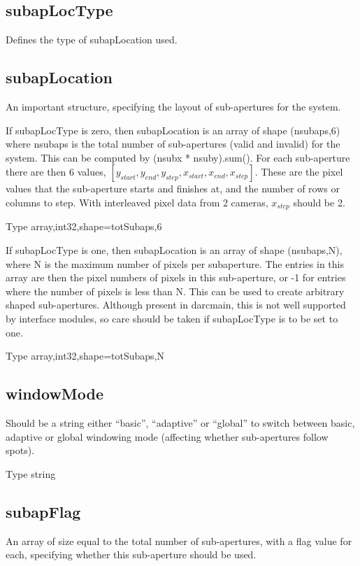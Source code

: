 \documentclass[a4,10pt]{article}
\begin{document}
\subsection{subapLocType}
Defines the type of subapLocation used.


\subsection{subapLocation}

An important structure, specifying the layout of sub-apertures for the
system.  

If subapLocType is zero, then subapLocation is an array of shape (nsubaps,6) where nsubaps is the
total number of sub-apertures (valid and invalid) for the system.
This can be computed by (nsubx * nsuby).sum().  For each sub-aperture
there are then 6 values,
$[y_{start},y_{end},y_{step},x_{start},x_{end},x_{step}]$.  These are
the pixel values that the sub-aperture starts and finishes at, and the
number of rows or columns to step.  With interleaved pixel data from 2
cameras, $x_{step}$ should be 2.  

Type array,int32,shape=totSubaps,6

If subapLocType is one, then subapLocation is an array of shape
(nsubaps,N), where N is the maximum number of pixels per subaperture.
The entries in this array are then the pixel numbers of pixels in this
sub-aperture, or -1 for entries where the number of pixels is less
than N.  This can be used to create arbitrary shaped sub-apertures.
Although present in darcmain, this is not well supported by interface
modules, so care should be taken if subapLocType is to be set to one.

Type array,int32,shape=totSubaps,N

\subsection{windowMode}
Should be a string either ``basic'', ``adaptive'' or ``global'' to
switch between basic, adaptive or global windowing mode (affecting
whether sub-apertures follow spots).

Type string

\subsection{subapFlag}
An array of size equal to the total number of sub-apertures, with a
flag value for each, specifying whether this sub-aperture should be
used.
\end{document}
